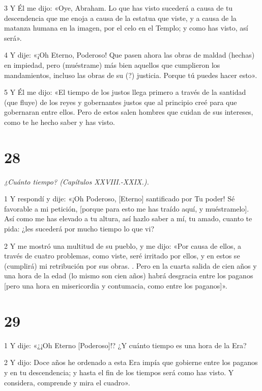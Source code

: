 \par 3 Y Él me dijo: «Oye, Abraham. Lo que has visto sucederá a causa de tu descendencia que me enoja a causa de la estatua que viste, y a causa de la matanza humana en la imagen, por el celo en el Templo; y como has visto, así será».

\par 4 Y dije: «¡Oh Eterno, Poderoso! Que pasen ahora las obras de maldad (hechas) en impiedad, pero (muéstrame) más bien aquellos que cumplieron los mandamientos, incluso las obras de su (?) justicia. Porque tú puedes hacer esto».

\par 5 Y Él me dijo: «El tiempo de los justos llega primero a través de la santidad (que fluye) de los reyes y gobernantes justos que al principio creé para que gobernaran entre ellos. Pero de estos salen hombres que cuidan de sus intereses, como te he hecho saber y has visto.

\chapter{28}

\par \textit{¿Cuánto tiempo? (Capítulos XXVIII.-XXIX.).}

\par 1 Y respondí y dije: «¡Oh Poderoso, [Eterno] santificado por Tu poder! Sé favorable a mi petición, [porque para esto me has traído aquí, y muéstramelo]. Así como me has elevado a tu altura, así hazlo saber a mí, tu amado, cuanto te pida: ¿les sucederá por mucho tiempo lo que vi?

\par 2 Y me mostró una multitud de su pueblo, y me dijo: «Por causa de ellos, a través de cuatro problemas, como viste, seré irritado por ellos, y en estos se (cumplirá) mi retribución por sus obras. . Pero en la cuarta salida de cien años y una hora de la edad (lo mismo son cien años) habrá desgracia entre los paganos [pero una hora en misericordia y contumacia, como entre los paganos]».

\chapter{29}

\par 1 Y dije: «¿¡Oh Eterno [Poderoso]!? ¿Y cuánto tiempo es una hora de la Era?

\par 2 Y dijo: Doce años he ordenado a esta Era impía que gobierne entre los paganos y en tu descendencia; y hasta el fin de los tiempos será como has visto. Y considera, comprende y mira el cuadro».

